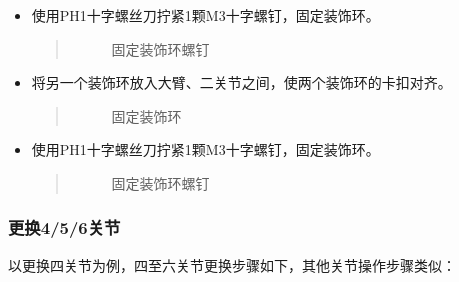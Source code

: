 \documentclass[a4paper,11pt,english,openany,oneside]{sphinxmanual}
\begin{document}
\begin{itemize}
\begin{itemize}
\begin{quote}
\begin{figure}[H]
\noindent{}
\caption{固定装饰环}\label{\detokenize{_u66f4_u6362_u5173_u8282:id67}}\end{figure}
\end{quote}

\item {} 
\sphinxAtStartPar
使用PH1十字螺丝刀拧紧1颗M3十字螺钉，固定装饰环。
\begin{quote}

\begin{figure}[H]
\centering
\capstart

\noindent{}
\caption{固定装饰环螺钉}\label{\detokenize{_u66f4_u6362_u5173_u8282:id68}}\end{figure}
\end{quote}

\item {} 
\sphinxAtStartPar
将另一个装饰环放入大臂、二关节之间，使两个装饰环的卡扣对齐。
\begin{quote}

\begin{figure}[H]
\centering
\capstart

\noindent{}
\caption{固定装饰环}\label{\detokenize{_u66f4_u6362_u5173_u8282:id69}}\end{figure}
\end{quote}

\item {} 
\sphinxAtStartPar
使用PH1十字螺丝刀拧紧1颗M3十字螺钉，固定装饰环。
\begin{quote}

\begin{figure}[H]
\centering
\capstart

\noindent{}
\caption{固定装饰环螺钉}\label{\detokenize{_u66f4_u6362_u5173_u8282:id70}}\end{figure}
\end{quote}

\end{itemize}

\end{itemize}


\subsubsection{更换4/5/6关节}
\label{\detokenize{_u66f4_u6362_u5173_u8282:id16}}\label{\detokenize{_u66f4_u6362_u5173_u8282:id17}}
\sphinxAtStartPar
以更换四关节为例，四至六关节更换步骤如下，其他关节操作步骤类似：
\end{document}
